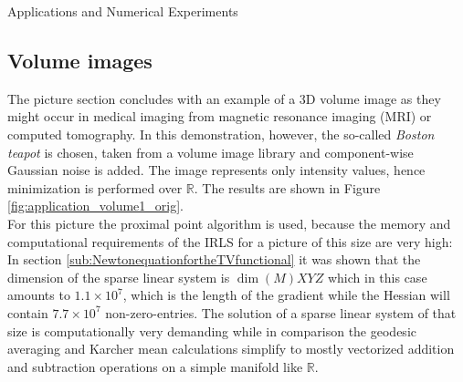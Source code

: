 \begin{chapter}{Applications and Numerical Experiments}
\subsection{Volume images} %
\label{sub:Volume images}
The picture section concludes with an example of a 3D volume image as they might occur in medical imaging from magnetic resonance imaging (MRI) or
computed tomography. In this demonstration, however, the so-called \emph{Boston teapot} is chosen, taken from a volume image library \cite{volvis}
and component-wise Gaussian noise is added. The image represents only intensity values, hence minimization is performed over $\mathbb{R}$. The results are shown
in Figure \ref{fig:application_volume1_orig}.\\

For this picture the proximal point algorithm is used, because the memory and computational requirements of the IRLS for a picture of this size are very high:
In section \ref{sub:NewtonequationfortheTVfunctional} it was shown that the dimension of the sparse linear system is $\operatorname{dim}(M)XYZ$ which
in this case amounts to $1.1\times 10^{7}$, which is the length of the gradient while the Hessian will contain $7.7\times 10^{7}$ non-zero-entries.
The solution of a sparse linear system of that size is computationally very demanding while in comparison the geodesic averaging and Karcher mean calculations
simplify to mostly vectorized addition and subtraction operations on a simple manifold like $\mathbb{R}$.


\end{chapter}
